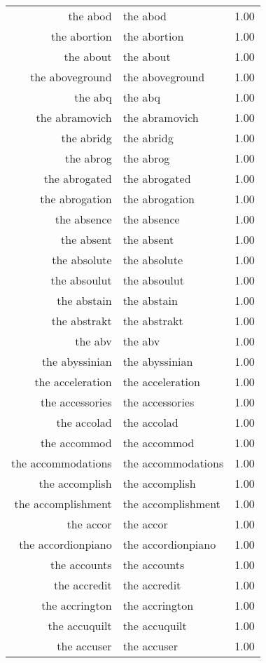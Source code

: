 \begin{table}[ht]
\begin{tabular}{rlr}
  the abod & the abod & 1.00 \\ 
  the abortion & the abortion & 1.00 \\ 
  the about & the about & 1.00 \\ 
  the aboveground & the aboveground & 1.00 \\ 
  the abq & the abq & 1.00 \\ 
  the abramovich & the abramovich & 1.00 \\ 
  the abridg & the abridg & 1.00 \\ 
  the abrog & the abrog & 1.00 \\ 
  the abrogated & the abrogated & 1.00 \\ 
  the abrogation & the abrogation & 1.00 \\ 
  the absence & the absence & 1.00 \\ 
  the absent & the absent & 1.00 \\ 
  the absolute & the absolute & 1.00 \\ 
  the absoulut & the absoulut & 1.00 \\ 
  the abstain & the abstain & 1.00 \\ 
  the abstrakt & the abstrakt & 1.00 \\ 
  the abv & the abv & 1.00 \\ 
  the abyssinian & the abyssinian & 1.00 \\ 
  the acceleration & the acceleration & 1.00 \\ 
  the accessories & the accessories & 1.00 \\ 
  the accolad & the accolad & 1.00 \\ 
  the accommod & the accommod & 1.00 \\ 
  the accommodations & the accommodations & 1.00 \\ 
  the accomplish & the accomplish & 1.00 \\ 
  the accomplishment & the accomplishment & 1.00 \\ 
  the accor & the accor & 1.00 \\ 
  the accordionpiano & the accordionpiano & 1.00 \\ 
  the accounts & the accounts & 1.00 \\ 
  the accredit & the accredit & 1.00 \\ 
  the accrington & the accrington & 1.00 \\ 
  the accuquilt & the accuquilt & 1.00 \\ 
  the accuser & the accuser & 1.00 \\ 

\end{tabular}
\end{table}
